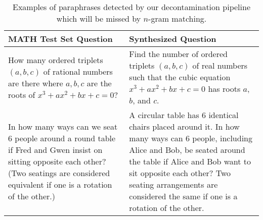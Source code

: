 \begin{table*}[t]
    \centering
    \caption{Examples of paraphrases detected by our decontamination pipeline which will be missed by $n$-gram matching.}
    \begin{tabular}{p{}p{}}
    \toprule
    \textbf{MATH Test Set Question} &  \textbf{Synthesized Question} \\
    \midrule
       How many ordered triplets $(a,b,c)$ of rational numbers are there where $a,b,c$ are the roots of $x^3 + ax^2 + bx + c = 0?$    & Find the number of ordered triplets $(a,b,c)$ of real numbers such that the cubic equation $x^3+ax^2+bx+c=0$ has roots $a$, $b$, and $c$. \\\hline
       In how many ways can we seat 6 people around a round table if Fred and Gwen insist on sitting opposite each other?  (Two seatings are considered equivalent if one is a rotation of the other.)    &  A circular table has 6 identical chairs placed around it. In how many ways can 6 people, including Alice and Bob, be seated around the table if Alice and Bob want to sit opposite each other? Two seating arrangements are considered the same if one is a rotation of the other. \\\bottomrule
    \end{tabular}
    \label{tab:ngram_misses}
\end{table*}
